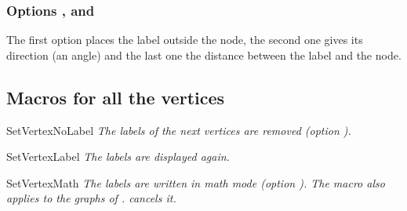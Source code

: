\subsubsection{Options ,  and }
The first option places the label outside the node, the second one gives
its direction (an angle) and the last one the distance between the label and
the node.

\begin{tkzexample}[latex=7cm,small]
\end{tkzexample}

\subsection{Macros for all the vertices}

\begin{NewMacroBox}{SetVertexNoLabel}{}
\emph{The labels of the next vertices are removed (option
).}
\end{NewMacroBox}

\begin{NewMacroBox}{SetVertexLabel}{}
\emph{The labels are displayed again.}
\end{NewMacroBox}

\begin{tkzexample}[latex=7cm,small]
\end{tkzexample}

\begin{NewMacroBox}{SetVertexMath}{}
\emph{The labels are written in math mode (option ). The
macro also applies to the graphs of .
 cancels it.}
\end{NewMacroBox}

\begin{tkzexample}[latex=7cm,small]
\end{tkzexample}

